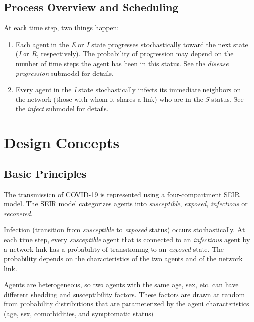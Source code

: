 \documentclass[nofonts,]{tufte-handout}
\providecommand{\tightlist}{%
  \setlength{\itemsep}{0pt}\setlength{\parskip}{0pt}}
\begin{document}
\hypertarget{process-overview-and-scheduling}{%
\subsection{Process Overview and
Scheduling}\label{process-overview-and-scheduling}}

At each time step, two things happen:

\begin{enumerate}
\def\labelenumi{\arabic{enumi}.}
\tightlist
\item
  Each agent in the \emph{E} or \emph{I} state progresses stochastically
  toward the next state (\emph{I} or \emph{R}, respectively). The
  probability of progression may depend on the number of time steps the
  agent has been in this status. See the \emph{disease progression}
  submodel for details.
\item
  Every agent in the \emph{I} state stochastically infects its immediate
  neighbors on the network (those with whom it shares a link) who are in
  the \emph{S} status. See the \emph{infect} submodel for details.
\end{enumerate}

\hypertarget{design-concepts}{%
\section{Design Concepts}\label{design-concepts}}

\hypertarget{basic-principles}{%
\subsection{Basic Principles}\label{basic-principles}}

The transmission of COVID-19 is represented using a four-compartment
SEIR model. The SEIR model categorizes agents into \emph{susceptible},
\emph{exposed}, \emph{infectious} or \emph{recovered}.

Infection (transition from \emph{susceptible} to \emph{exposed} status)
occurs stochastically. At each time step, every \emph{susceptible} agent
that is connected to an \emph{infectious} agent by a network link has a
probability of transitioning to an \emph{exposed} state. The probability
depends on the characteristics of the two agents and of the network
link.

Agents are heterogeneous, so two agents with the same age, sex, etc. can
have different shedding and susceptibility factors. These factors are
drawn at random from probability distributions that are parameterized by
the agent characteristics (age, sex, comorbidities, and symptomatic
status)
\end{document}
